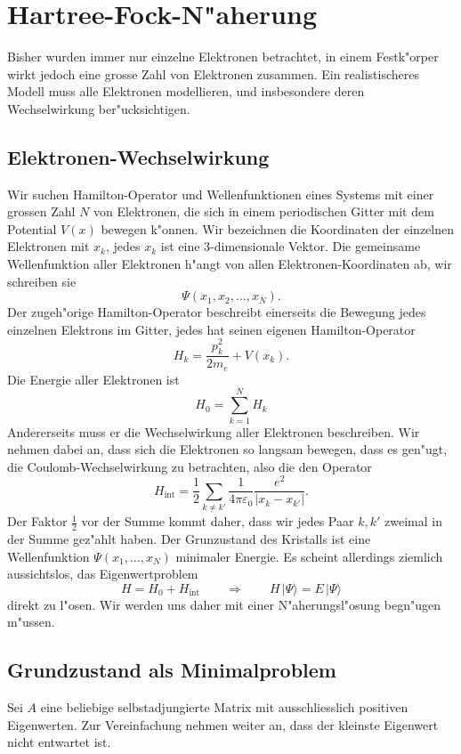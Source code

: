 \section{Hartree-Fock-N"aherung\label{section:hartree-fock}}
Bisher wurden immer nur einzelne Elektronen betrachtet, in einem 
Festk"orper wirkt jedoch eine grosse Zahl von Elektronen zusammen.
Ein realistischeres Modell muss alle Elektronen modellieren, und
insbesondere deren Wechselwirkung ber"ucksichtigen.

\subsection{Elektronen-Wechselwirkung}
Wir suchen Hamilton-Operator und Wellenfunktionen eines Systems mit einer
grossen Zahl $N$ von Elektronen, die sich in einem periodischen Gitter mit dem
Potential $V(x)$ bewegen k"onnen.
Wir bezeichnen die Koordinaten der einzelnen Elektronen mit $x_k$, jedes
$x_k$ ist eine 3-dimensionale Vektor.
Die gemeinsame Wellenfunktion aller Elektronen h"angt von allen
Elektronen-Koordinaten ab, wir schreiben sie
\[
\Psi(x_1,x_2,\dots,x_N).
\]
Der zugeh"orige Hamilton-Operator beschreibt einerseits die Bewegung
jedes einzelnen Elektrons im Gitter, jedes hat seinen eigenen
Hamilton-Operator
\[
H_k=\frac{p_k^2}{2m_e}+V(x_k).
\]
Die Energie aller Elektronen ist
\[
H_0= \sum_{k=1}^N H_k
\]
Andererseits muss er die Wechselwirkung aller Elektronen beschreiben.
Wir nehmen dabei an, dass sich die Elektronen so langsam bewegen, dass
es gen"ugt, die Coulomb-Wechselwirkung zu betrachten, also die den
Operator
\[
H_{\text{int}}
=
\frac12\sum_{k\ne k'}\frac{1}{4\pi\varepsilon_0}\frac{e^2}{|x_k-x_{k'}|}.
\]
Der Faktor $\frac12$ vor der Summe kommt daher, dass wir jedes Paar
$k,k'$ zweimal in der Summe gez"ahlt haben.
Der Grunzustand des Kristalls ist eine Wellenfunktion $\Psi(x_1,\dots,x_N)$
minimaler Energie.
Es scheint allerdings ziemlich aussichtslos, das Eigenwertproblem
\begin{equation}
H=H_0+H_{\text{int}}
\qquad \Rightarrow\qquad
H\,|\Psi\rangle = E\,|\Psi\rangle
\label{skript:multielektronewproblem}
\end{equation}
direkt zu l"osen. Wir werden uns daher mit einer N"aherungsl"osung 
begn"ugen m"ussen.

\subsection{Grundzustand als Minimalproblem}
Sei $A$ eine beliebige selbstadjungierte Matrix mit ausschliesslich
positiven Eigenwerten.
Zur Vereinfachung nehmen weiter an, dass der kleinste Eigenwert nicht 
entwartet ist.

